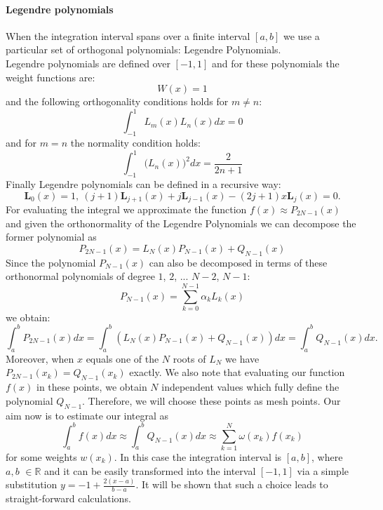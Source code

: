 \documentclass[10pt,a4paper,titlepage]{article}
\begin{document}
\paragraph{Legendre polynomials} When the integration interval spans over a finite interval $[a,b]$ we use a particular set of orthogonal polynomials: Legendre Polynomials. 
\\Legendre  polynomials are defined over $[-1,1]$ and for these polynomials the weight functions are:
\begin{equation} 
W(x)= 1
\end{equation}
and the following orthogonality conditions holds for $m\neq n$:
\begin{equation}
\int_{-1}^{1}  L_{m}(x) L_{n}(x) dx=0
\end{equation}
and for $m=n$ the normality condition holds:
\begin{equation}
\int_{-1}^{1} \big(L_{n}(x)\big) ^2 dx=\frac{2}{2n+1}
\end{equation}
Finally Legendre polynomials can be defined in a recursive way: 
\begin{equation}
\textbf{L}_{0}(x)=1, \  
(j+1)\textbf{L}_{j+1}(x)+j\textbf{L}_{j-1}(x)-(2j+1)x\textbf{L}_{j}(x)=0.
\end{equation}
For evaluating the integral we approximate the function $f(x) \approx P_{2N-1}(x)$ and given the orthonormality of the Legendre Polynomials we can decompose the former polynomial as $$P_{2N-1}(x)=L_{N}(x)P_{N-1}(x)+Q_{N-1}(x)$$ 
Since the polynomial $P_{N-1}(x)$ can also be decomposed in terms of these orthonormal polynomials of degree $1$, $2$, ... $N-2$, $N-1$: 
\begin{equation}
P_{N-1}(x)=\sum_{k=0}^{N-1} \alpha_{k}L_{k}(x)
\end{equation}
we obtain:
\begin{equation}
\int_{a}^{b} P_{2N-1}(x)dx=\int_{a}^{b}(L_{N}(x)P_{N-1}(x)+Q_{N-1}(x))dx=\int_{a}^{b}Q_{N-1}(x)dx.
\end{equation}
Moreover, when $x$ equals one of the $N$ roots of $L_{N}$ we have $P_{2N-1}(x_{k})=Q_{N-1}(x_{k})$ exactly. We also note that evaluating our function $f(x)$ in these points, we obtain $N$ independent values which fully define the polynomial $Q_{N-1}$. Therefore, we will choose these points as mesh points.
Our aim now is to estimate our integral as 
\begin{equation}
\int_{a}^{b}f(x)dx \approx \int_{a}^{b}Q_{N-1}(x)dx \approx \sum_{k=1}^{N} \omega(x_{k})f(x_k)
\end{equation}
for some weights $w(x_k)$. In this case the integration interval is $[a,b]$, where $a,b$ $\in \mathbb{R}$ and it can be easily transformed into the interval $[-1,1]$ via a simple substitution $y=-1+\frac{2(x-a)}{b-a}$. It will be shown that such a choice leads to straight-forward calculations.
\end{document}
